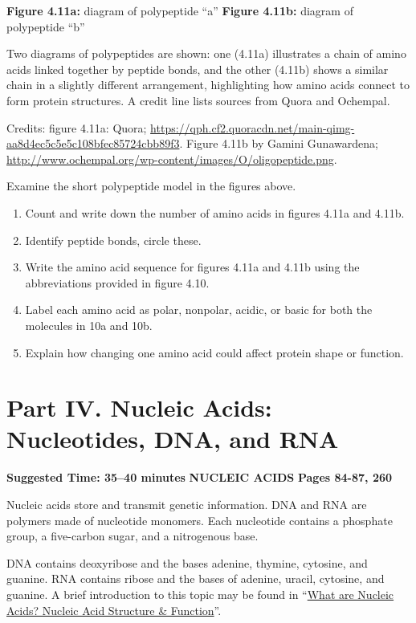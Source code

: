 \documentclass[
  letterpaper,
  DIV=11,
  numbers=noendperiod]{scrreprt}
\begin{document}
\textbf{Figure 4.11a:} diagram of polypeptide ``a'' \textbf{Figure
4.11b:} diagram of polypeptide ``b''

Two diagrams of polypeptides are shown: one (4.11a) illustrates a chain
of amino acids linked together by peptide bonds, and the other (4.11b)
shows a similar chain in a slightly different arrangement, highlighting
how amino acids connect to form protein structures. A credit line lists
sources from Quora and Ochempal.

Credits: figure 4.11a: Quora;
\url{https://qph.cf2.quoracdn.net/main-qimg-aa8d4ec5c5e5c108bfec85724cbb89f3}.
Figure 4.11b by Gamini Gunawardena;
\url{http://www.ochempal.org/wp-content/images/O/oligopeptide.png}.

Examine the short polypeptide model in the figures above.

\begin{enumerate}
\def\labelenumi{\arabic{enumi}.}
\item
  Count and write down the number of amino acids in figures 4.11a and
  4.11b.
\item
  Identify peptide bonds, circle these.
\item
  Write the amino acid sequence for figures 4.11a and 4.11b using the
  abbreviations provided in figure 4.10.
\item
  Label each amino acid as polar, nonpolar, acidic, or basic for both
  the molecules in 10a and 10b.
\item
  Explain how changing one amino acid could affect protein shape or
  function.
\end{enumerate}

\section{\texorpdfstring{\textbf{Part IV. Nucleic Acids: Nucleotides,
DNA, and
RNA}}{Part IV. Nucleic Acids: Nucleotides, DNA, and RNA}}\label{part-iv.-nucleic-acids-nucleotides-dna-and-rna}

\textbf{Suggested Time: 35--40 minutes} \textbf{NUCLEIC ACIDS}
\textbf{Pages 84-87, 260}

Nucleic acids store and transmit genetic information. DNA and RNA are
polymers made of nucleotide monomers. Each nucleotide contains a
phosphate group, a five-carbon sugar, and a nitrogenous base.

DNA contains deoxyribose and the bases adenine, thymine, cytosine, and
guanine. RNA contains ribose and the bases of adenine, uracil, cytosine,
and guanine. A brief introduction to this topic may be found in
``\href{https://youtu.be/lm14Les80Tk?si=-CBX6D4UbcOEWI3h}{What are
Nucleic Acids? Nucleic Acid Structure \& Function}''.
\end{document}
